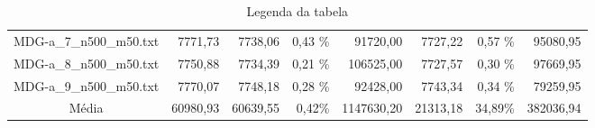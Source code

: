 \begin{landscape}
\begin{table}[ht]
\begin{tabular}{| c | r | r | r | r | r | r | r |  }
		MDG-a\_7\_n500\_m50.txt&7771,73&7738,06&0,43 \%&91720,00&7727,22&0,57 \%&95080,95\\
		MDG-a\_8\_n500\_m50.txt&7750,88&7734,39&0,21 \%&106525,00&7727,57&0,30 \%&97669,95\\
		MDG-a\_9\_n500\_m50.txt&7770,07&7748,18&0,28 \%&92428,00&7743,34&0,34 \%&79259,95\\
\hline 		Média&60980,93&60639,55&0,42\%&1147630,20&21313,18&34,89\%&382036,94\\ 
\hline
	\end{tabular}
	\caption{Legenda da tabela}
	\label{seu_label}
	\end{table}
\end{landscape}
